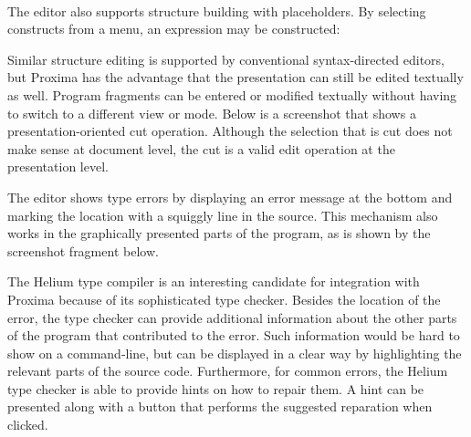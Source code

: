  \then 
{} \then 
{} \\

The editor also supports structure building with placeholders. By selecting constructs from a menu, an expression may be constructed:

 \then
 \then


Similar structure editing is supported by conventional syntax-directed editors, but Proxima has the advantage that the presentation can still be edited textually as well. Program fragments can be entered or modified textually without having to switch to a different view or mode.  Below is a screenshot that shows a presentation-oriented cut operation. Although the selection that is cut does not make sense at document level, the cut is a valid edit operation at the presentation level.

 \then



The editor shows type errors by displaying an error message at the bottom and marking the location with a squiggly line in the source. This mechanism also works in the graphically presented parts of the program, as is shown by the screenshot fragment below.


The Helium type compiler is an interesting candidate for integration with Proxima because of its sophisticated type checker. Besides the location of the error, the type checker can provide additional information about the other parts of the program that contributed to the error. Such information would be hard to show on a command-line, but can be displayed in a clear way by highlighting the relevant parts of the source code. Furthermore, for common errors, the Helium type checker is able to provide hints on how to repair them. A hint can be presented along with a button that performs the suggested reparation when clicked.


